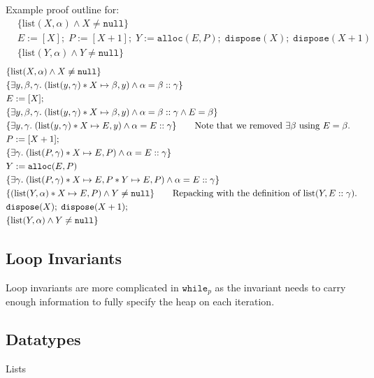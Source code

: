 \documentclass[a4paper, 11pt]{article}
\begin{document}
{{        Example proof outline for:
        \begin{align*}
        & \{\text{list}(X,\alpha) \wedge X \neq \texttt{null}\} \\
        & E:=[X];\;P:=[X+1];\;Y:=\texttt{alloc}(E,P);\;\texttt{dispose}(X);\;\texttt{dispose}(X+1) \\
        & \{\text{list}(Y,\alpha) \wedge Y \neq \texttt{null}\}
        \end{align*}
        \begin{align*}
        & \{\text{list}(X,\alpha) \wedge X \neq \texttt{null}\} \\
        & \{\exists y,\beta,\gamma.\; (\text{list}(y, \gamma) * X \mapsto \beta,y) \wedge \alpha=\beta::\gamma\} \\
        & E := [X]; \\
        & \{\exists y,\beta,\gamma.\; (\text{list}(y, \gamma) * X \mapsto \beta,y) \wedge \alpha=\beta::\gamma \wedge E = \beta\} \\
        & \{\exists y,\gamma.\; (\text{list}(y, \gamma) * X \mapsto E,y) \wedge \alpha=E::\gamma\} \tag*{Note that we removed \(\exists \beta\) using \(E=\beta\).} \\
        & P := [X+1]; \\
        & \{\exists \gamma.\; (\text{list}(P, \gamma) * X \mapsto E,P) \wedge \alpha=E::\gamma\} \\
        & Y := \texttt{alloc}(E,P) \\
        & \{\exists \gamma.\; (\text{list}(P, \gamma) * X \mapsto E,P * Y \mapsto E,P) \wedge \alpha=E::\gamma\} \\
        & \{(\text{list}(Y, \alpha) * X \mapsto E,P) \wedge Y \neq \texttt{null}\} \tag*{Repacking with the definition of \(\text{list}(Y, E::\gamma)\).} \\
        & \texttt{dispose}(X);\;\texttt{dispose}(X + 1); \\
        & \{\text{list}(Y,\alpha) \wedge Y \neq \texttt{null}\}
        \end{align*}
    }
    \subsection*{Loop Invariants}
    {
        Loop invariants are more complicated in \(\texttt{while}_p\) as the invariant needs to carry enough information to fully specify the heap on each iteration.
    }
    \subsection*{Datatypes}
    {
        \begin{description}
        \item[Lists]
        {
            \hfill

}
\end{description}}}
\end{document}
